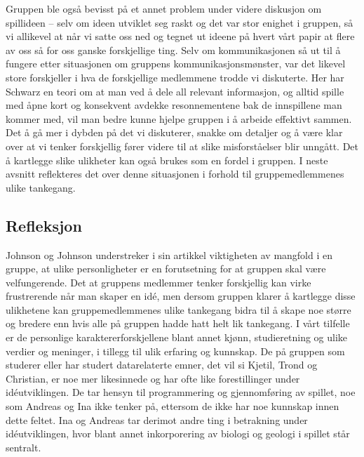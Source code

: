 Gruppen ble også bevisst på et annet problem under videre diskusjon
om spillideen – selv om ideen utviklet seg raskt og det var stor enighet
i gruppen, så vi allikevel at når vi satte oss ned og tegnet ut ideene
på hvert vårt papir at flere av oss så for oss ganske forskjellige ting.
Selv om kommunikasjonen så ut til å fungere etter situasjonen om
gruppens kommunikasjonsmønster, var det likevel store forskjeller i hva
de forskjellige medlemmene trodde vi diskuterte. Her har Schwarz en
teori om at man ved å dele all relevant informasjon, og alltid spille
med åpne kort og konsekvent avdekke resonnementene bak de innspillene
man kommer med, vil man bedre kunne hjelpe gruppen i å arbeide effektivt
sammen. Det å gå mer i dybden på det vi diskuterer, snakke om detaljer
og å være klar over at vi tenker forskjellig fører videre til at slike
misforståelser blir unngått. Det å kartlegge slike ulikheter kan også
brukes som en fordel i gruppen. I neste avsnitt reflekteres det over
denne situasjonen i forhold til gruppemedlemmenes ulike tankegang.

	\subsection{Refleksjon} %
	Johnson og Johnson \cite{Johnson} understreker i sin artikkel viktigheten av mangfold i en gruppe, at ulike personligheter er en forutsetning for at gruppen skal være velfungerende. Det at gruppens medlemmer tenker forskjellig kan virke frustrerende når man skaper en idé, men dersom gruppen klarer å kartlegge disse ulikhetene kan gruppemedlemmenes ulike tankegang bidra til å skape noe større og bredere enn hvis alle på gruppen hadde hatt helt lik tankegang. I vårt tilfelle er de personlige karaktererforskjellene blant annet kjønn, studieretning og ulike verdier og meninger, i tillegg til ulik erfaring og kunnskap. De på gruppen som studerer eller har studert datarelaterte emner, det vil si Kjetil, Trond og Christian, er noe mer likesinnede og har ofte like forestillinger under idéutviklingen. De tar hensyn til programmering og gjennomføring av spillet, noe som Andreas og Ina ikke tenker på, ettersom de ikke har noe kunnskap innen dette feltet. Ina og Andreas tar derimot andre ting i betrakning under idéutviklingen, hvor blant annet inkorporering av biologi og geologi i spillet står sentralt.

